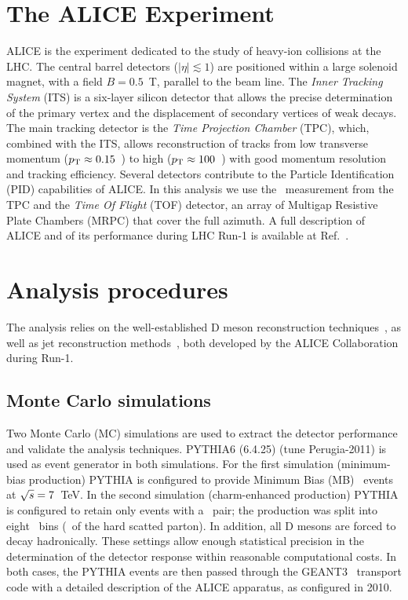 \documentclass[a4paper]{jpconf}
\begin{document}
\section{The ALICE Experiment}
ALICE is the experiment dedicated to the study of heavy-ion collisions at the LHC.
The central barrel detectors ($\lvert \eta\rvert \lesssim 1$) are positioned within a large solenoid magnet, with a
field $B = 0.5$~T, parallel to the beam line.
The \emph{Inner Tracking System} (ITS) is a six-layer silicon detector that allows the precise determination of the primary vertex 
and the displacement of secondary vertices of weak decays.
The main tracking detector is the \emph{Time Projection Chamber} (TPC), which, combined with the ITS, allows reconstruction of tracks 
from low transverse momentum ($p_{\rm T}\approx0.15$~\GeVc) to high
($p_{\rm T}\approx100$~\GeVc) with good momentum resolution and tracking efficiency.
Several detectors contribute to the Particle Identification (PID) capabilities of ALICE. 
In this analysis we use the \dedx\ measurement from the TPC and
the \emph{Time Of Flight} (TOF) detector,
an array of Multigap Resistive Plate Chambers (MRPC) that cover the full azimuth.
A full description of ALICE and of its performance during LHC Run-1 is available at Ref.~\cite{ALICE:2014b}.

\section{Analysis procedures}
The analysis relies on the well-established D meson reconstruction techniques~\cite{ALICE:2012d, ALICE:2016a}, as well as
jet reconstruction methods~\cite{ALICE:2013c, ALICE:2015a, ALICE:2015e}, both developed by the ALICE Collaboration during Run-1.

\subsection{Monte Carlo simulations}
Two Monte Carlo (MC) simulations are used to extract the detector performance and validate the analysis techniques.
PYTHIA6 (6.4.25)\cite{Sjostrand:2006} (tune Perugia-2011) is used as event generator in both simulations.
For the first simulation (minimum-bias production) PYTHIA is configured to provide Minimum Bias (MB) \pp\ events at $\sqrt{s}=7$~TeV.
In the second simulation (charm-enhanced production) PYTHIA is configured to retain only events with a \ccbar\ pair; the production
was split into eight \pthard\ bins (\pT\ of the hard scatted parton). In addition, all D mesons are forced
to decay hadronically. These settings allow enough statistical precision in the determination of the detector response within reasonable
computational costs.
In both cases, the PYTHIA events are then passed through the GEANT3~\cite{GEANT3-url} transport code with a detailed description of the ALICE apparatus,
as configured in 2010.
\end{document}
